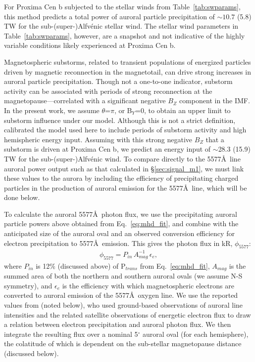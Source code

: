 \documentclass{emulateapj}
\begin{document}
For Proxima Cen b subjected to the stellar winds from Table~\ref{tab:swparams}, this method predicts a total power of auroral particle precipitation of ${\sim} 10.7$ (5.8) TW for the sub-\mbox{(super-)}Alfv\'{e}nic stellar wind. The stellar wind parameters in Table~\ref{tab:swparams}, however, are a snapshot and not indicative of the highly variable conditions likely experienced at Proxima Cen b.

Magnetospheric substorms, related to transient populations of energized particles driven by magnetic reconnection in the magnetotail, can drive strong increases in auroral particle precipitation. Though not a one-to-one indicator, substorm activity can be associated with periods of strong reconnection at the magnetopause---correlated with a significant negative $B_Z$ component in the IMF. In the present work, we assume $\theta$=$\pi$, or B$_Y$=0, to obtain an upper limit to substorm influence under our model. Although this is not a strict definition, \citet{Wang2014} calibrated the model used here to include periods of substorm activity and high hemispheric energy input. Assuming with this strong negative $B_Z$ that a substorm is driven at Proxima Cen b, we predict an energy input of $\sim$28.3 (15.9) TW for the sub-\mbox{(super-)}Alfv\'{e}nic wind. To compare directly to the 5577\AA\ line auroral power output such as that calculated in \S\ref{sec:signal_m1}, we must link these values to the aurora by including the efficiency of precipitating charged particles in the production of auroral emission for the 5577\AA\ line, which will be done below.

To calculate the auroral 5577\AA\ photon flux, we use the precipitating auroral particle powers above obtained from Eq.~\ref{eq:mhd_fit}, and combine with the anticipated size of the auroral oval and an observed conversion efficiency for electron precipitation to 5577\AA\ emission. This gives the photon flux in kR, $\phi_{5577}$:
%
\begin{align}
    \phi_{5577} = P_{in}\, A_{mag}^{-1}\, \epsilon_e,
\end{align}
%
where $P_{in}$ is 12\% (discussed above) of P$_{trans}$ from Eq.~\ref{eq:mhd_fit}, $A_{mag}$ is the summed area of both the northern and southern auroral ovals (we assume N-S symmetry), and $\epsilon_e$ is the efficiency with which magnetospheric electrons are converted to auroral emission of the 5577\AA\ oxygen line. We use the reported values from \citet{Steele1990} (noted below), who used ground-based observations of auroral line intensities and the related satellite observations of energetic electron flux to draw a relation between electron precipitation and auroral photon flux. We then integrate the resulting flux over a nominal 5$^\circ$ auroral oval (for each hemisphere), the colatitude of which is dependent on the sub-stellar magnetopause distance (discussed below). 
\end{document}
